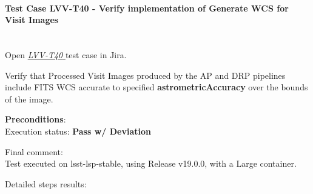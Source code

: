 \documentclass[DM,STR,toc]{lsstdoc}
\begin{document}
\paragraph{Test Case LVV-T40 -  Verify implementation of Generate WCS for Visit Images
 }\mbox{}\\

Open  \href{https://jira.lsstcorp.org/secure/Tests.jspa#/testCase/LVV-T40}{\textit{ LVV-T40 } }
test case in Jira.

 Verify that Processed Visit Images produced by the AP and DRP pipelines
include FITS WCS accurate to specified \textbf{astrometricAccuracy} over
the bounds of the image.


\textbf{ Preconditions}:\\


Execution status: {\bf Pass w/ Deviation }

Final comment:\\ Test executed on lsst-lsp-stable, using Release v19.0.0, with a Large
container.



Detailed steps results:
\end{document}

